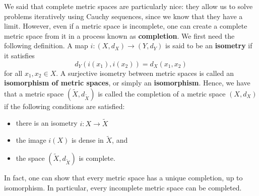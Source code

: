 \documentclass{article}
\theoremstyle{plain}
\theoremstyle{definition}
\theoremstyle{remark}
\begin{document}


We said that complete metric spaces are particularly nice: 
they allow us to solve problems iteratively using Cauchy sequences,
since we know that they have a limit.
However, even if a metric space is incomplete, 
one can create a complete metric space from it
in a process known as \textbf{completion}.
We first need the following definition.
A map $i : (X, d_X) \rightarrow (Y, d_Y)$ is said to be an \textbf{isometry}
if it satisfies
\begin{equation}
	d_Y(i(x_1), i(x_2)) 
	= d_X(x_1, x_2)
\end{equation}
for all $x_1, x_2 \in X$.
A surjective isometry between metric spaces is called an 
\textbf{isomorphism of metric spaces}, or simply an \textbf{isomorphism}.
Hence, we have that 
a metric space 
$(\tilde{X}, d_{\tilde{X}})$ is called 
the completion of a metric space $(X,d_X)$ if the following
conditions are satisfied:
\begin{itemize}
	\item there is an isometry $i : X \rightarrow \tilde{X}$
	\item the image $i(X)$ is dense in $\tilde{X}$, and
	\item the space $(\tilde{X}, d_{\tilde{X}})$ is complete.
\end{itemize}
In fact, one can show that 
every metric space has a unique completion, up to isomorphism.
In particular, every incomplete metric space can be completed.
\end{document}
